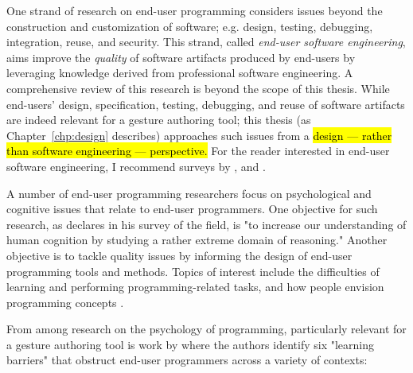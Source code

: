 

One strand of research on end-user programming considers issues beyond the construction and customization of software; e.g. design, testing, debugging, integration, reuse, and security. This strand, called \emph{end-user software engineering}, aims improve the \emph{quality} of software artifacts produced by end-users by leveraging knowledge derived from professional software engineering. A comprehensive review of this research is beyond the scope of this thesis. While end-users' design, specification, testing, debugging, and reuse of software artifacts are indeed relevant for a gesture authoring tool; this thesis  (as Chapter~\ref{chp:design} describes) approaches such issues from a \hl{design --- rather than software engineering --- perspective.} For the reader interested in end-user software engineering, I recommend surveys by \textcite{Burnett:2004}, and \textcite{Ko:2011}.


A number of end-user programming researchers focus on psychological and cognitive issues that relate to end-user programmers. One objective for such research, as \textcite{Blackwell:2006} declares in his survey of the field, is "to increase our understanding of human cognition by studying a rather extreme domain of reasoning." Another objective is to tackle quality issues by informing the design of end-user programming tools and methods. Topics of interest include the difficulties of learning \parencite{Ko:2004, Pea:1987} and performing \parencite{Lewis:1987} programming-related tasks, and how people envision programming concepts \parencite{Pane:2001}.

From among research on the psychology of programming, particularly relevant for a gesture authoring tool is work by \textcite{Ko:2004} where the authors identify six "learning barriers" that obstruct end-user programmers across a variety of contexts:

